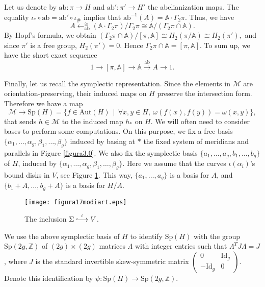 \documentclass[10pt]{amsart}
\numberwithin{equation}{section}
\numberwithin{equation}{section}
\theoremstyle{definition}
\newcommand{\hooklongrightarrow}{\lhook\joinrel\longrightarrow}
\begin{document}
Let us denote by $\text{ab}:\pi\rightarrow H$ and $\text{ab}':\pi'\rightarrow H'$ the abelianization maps. The equality $\iota_*\circ \text{ab}=\text{ab}'\circ\iota_{\#}$ implies that  $\text{ab}^{-1}(A)=\mathbb{A}\cdot\Gamma_2\pi$. Thus, we have 
\begin{equation*}%
A \mathrel{\mathop{\longleftarrow}^{\mathrm{\cong}}_{\text{ab}}} (\mathbb{A}\cdot\Gamma_2\pi)/\Gamma_2\pi\cong \mathbb{A}/(\Gamma_2\pi\cap\mathbb{A}).
\end{equation*}
By Hopf's formula, we obtain
$(\Gamma_2\pi\cap\mathbb{A})/[\pi,\mathbb{A}]\cong H_2(\pi/\mathbb{A})\cong H_2(\pi'),$
\noindent and since $\pi'$ is a free group, $H_2(\pi')=0$. Hence $\Gamma_2\pi\cap\mathbb{A}=[\pi,\mathbb{A}]$. To sum up, we have the short exact sequence
\begin{equation}\label{ecuacion3.3}%
1\longrightarrow [\pi,\mathbb{A}]\longrightarrow \mathbb{A}\stackrel{\text{ab}}{\longrightarrow}A\longrightarrow 1.
\end{equation}

Finally, let us recall the symplectic representation. Since the elements in $\mathcal{M}$ are orientation-preserving, their induced maps on $H$ preserve the intersection form. Therefore we have a map
$$\mathcal{M}\longrightarrow\text{Sp}(H)=\{f\in\text{Aut}(H)\ \ |\ \ \forall x,y\in H,\ \omega(f(x),f(y))=\omega(x,y) \},$$
that sends $h\in\mathcal{M}$ to the induced map $h_*$ on $H$. We will often need to consider bases to perform some computations. On this purpose, we fix  a free basis $\{\alpha_1,\ldots,\alpha_g,\beta_1,\ldots,\beta_g\}$ induced by basing at $*$ the fixed system of meridians and parallels in Figure \ref{figura3.0}. We also fix the   symplectic basis $\{a_1,\ldots,a_g, b_1, \ldots, b_g\}$ of $H$, induced by $\{\alpha_1,\ldots,\alpha_g,\beta_1,\ldots,\beta_g\}$. Here we assume that the curves $\iota(\alpha_i)$'s bound disks in $V$, see Figure \ref{figura17}. This way,  $\{a_1,\ldots,a_g\}$ is a basis for $A$,  and $\{b_1+A,\ldots, b_g+A\}$ is a basis for $H/A$. 
\begin{figure}[ht!]
										\centering
                        \texttt{[image: figura17modiart.eps]}
												\caption{The inclusion $\Sigma\stackrel{\iota}{\hooklongrightarrow}V$.}
												\label{figura17}
\end{figure}

We use the above symplectic basis of $H$ to identify $\text{Sp}(H)$ with the group  $\text{Sp}(2g,\mathbb{Z})$ of $(2g)\times(2g)$ matrices $\Lambda$ with integer entries such that  ${\Lambda}^TJ\Lambda=J$, where $J$ is the standard invertible skew-symmetric matrix $\left( \begin{smallmatrix} 0&\text{Id}_g\\ -\text{Id}_g&0 \end{smallmatrix} \right)$.  Denote this identification by $\psi:\text{Sp}(H)\rightarrow \text{Sp}(2g,\mathbb{Z})$.
\end{document}
